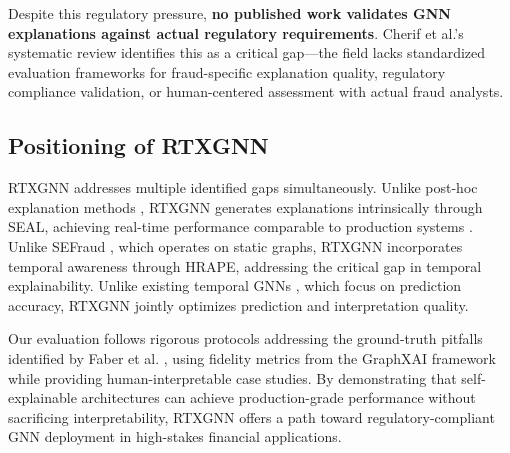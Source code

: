 Despite this regulatory pressure, \textbf{no published work validates GNN explanations against actual regulatory requirements}. Cherif et al.'s systematic review \citep{cherif2024survey} identifies this as a critical gap—the field lacks standardized evaluation frameworks for fraud-specific explanation quality, regulatory compliance validation, or human-centered assessment with actual fraud analysts.

\subsection{Positioning of RTXGNN}

RTXGNN addresses multiple identified gaps simultaneously. Unlike post-hoc explanation methods \citep{bhati2025survey, luo2020pgexplainer, yuan2021subgraphx}, RTXGNN generates explanations intrinsically through SEAL, achieving real-time performance comparable to production systems \citep{lu2022bright, wang2025real}. Unlike SEFraud \citep{li2024sefraud}, which operates on static graphs, RTXGNN incorporates temporal awareness through HRAPE, addressing the critical gap in temporal explainability. Unlike existing temporal GNNs \citep{pareja2020evolvegcn, you2022roland, sankar2020dysat}, which focus on prediction accuracy, RTXGNN jointly optimizes prediction and interpretation quality.

Our evaluation follows rigorous protocols addressing the ground-truth pitfalls identified by Faber et al. \citep{faber2021groundtruth}, using fidelity metrics from the GraphXAI framework \citep{agarwal2023graphxai} while providing human-interpretable case studies. By demonstrating that self-explainable architectures can achieve production-grade performance without sacrificing interpretability, RTXGNN offers a path toward regulatory-compliant GNN deployment in high-stakes financial applications.

